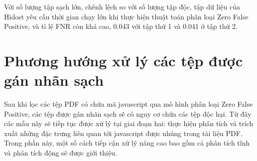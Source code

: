 \documentclass[./../main.tex]{subfiles}
\begin{document}
Với số lượng tập sạch lớn, chênh lệch so với số lượng tập độc, tập dữ liệu của Hidost yêu cầu thời gian chạy lớn khi thực hiện thuật toán phân loại Zero False Positive, và tỉ lệ FNR còn khá cao, 0.043 với tập thứ 1 và 0.041 ở tập thứ 2.

\section{Phương hướng xử lý các tệp được gán nhãn sạch}
Sau khi lọc các tệp PDF có chứa mã javascript qua mô hình phân loại Zero False Positive, các tệp được gán nhãn sạch sẽ có nguy cơ chứa các tệp độc hại. Từ đây các mẫu này sẽ tiếp tục được xử lý tại giai đoạn hai: thực hiện phân tích và trích xuất những đặc trưng liên quan tới javascript được nhúng trong tài liệu PDF. Trong phần này, một số cách tiếp cận xử lý nâng cao bao gồm cả phân tích tĩnh và phân tích động sẽ được giới thiệu.
\end{document}
